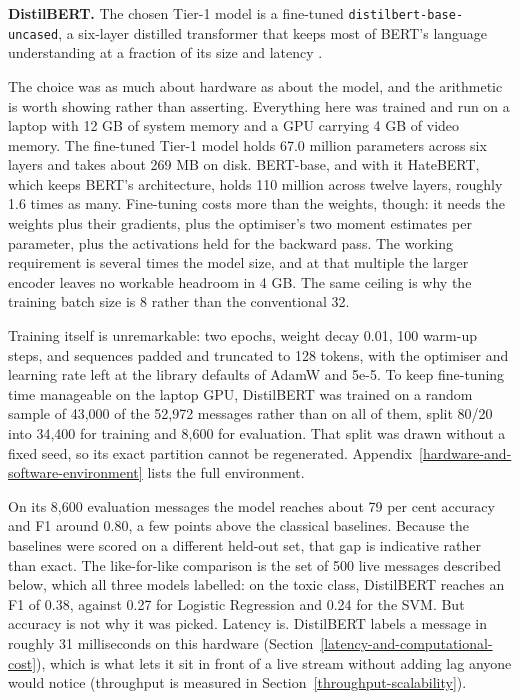 \textbf{DistilBERT.} The chosen Tier-1 model is a fine-tuned \texttt{distilbert-base-uncased}, a six-layer distilled transformer that keeps most of BERT's language understanding at a fraction of its size and latency \citep{distilbert2019}.

The choice was as much about hardware as about the model, and the arithmetic is worth showing rather than asserting. Everything here was trained and run on a laptop with 12 GB of system memory and a GPU carrying 4 GB of video memory. The fine-tuned Tier-1 model holds 67.0 million parameters across six layers and takes about 269 MB on disk. BERT-base, and with it HateBERT, which keeps BERT's architecture, holds 110 million across twelve layers, roughly 1.6 times as many. Fine-tuning costs more than the weights, though: it needs the weights plus their gradients, plus the optimiser's two moment estimates per parameter, plus the activations held for the backward pass. The working requirement is several times the model size, and at that multiple the larger encoder leaves no workable headroom in 4 GB. The same ceiling is why the training batch size is 8 rather than the conventional 32.

Training itself is unremarkable: two epochs, weight decay 0.01, 100 warm-up steps, and sequences padded and truncated to 128 tokens, with the optimiser and learning rate left at the library defaults of AdamW and 5e-5. To keep fine-tuning time manageable on the laptop GPU, DistilBERT was trained on a random sample of 43,000 of the 52,972 messages rather than on all of them, split 80/20 into 34,400 for training and 8,600 for evaluation. That split was drawn without a fixed seed, so its exact partition cannot be regenerated. Appendix~\ref{hardware-and-software-environment} lists the full environment.

On its 8,600 evaluation messages the model reaches about 79 per cent accuracy and F1 around 0.80, a few points above the classical baselines. Because the baselines were scored on a different held-out set, that gap is indicative rather than exact. The like-for-like comparison is the set of 500 live messages described below, which all three models labelled: on the toxic class, DistilBERT reaches an F1 of 0.38, against 0.27 for Logistic Regression and 0.24 for the SVM. But accuracy is not why it was picked. Latency is. DistilBERT labels a message in roughly 31 milliseconds on this hardware (Section~\ref{latency-and-computational-cost}), which is what lets it sit in front of a live stream without adding lag anyone would notice (throughput is measured in Section~\ref{throughput-scalability}).

